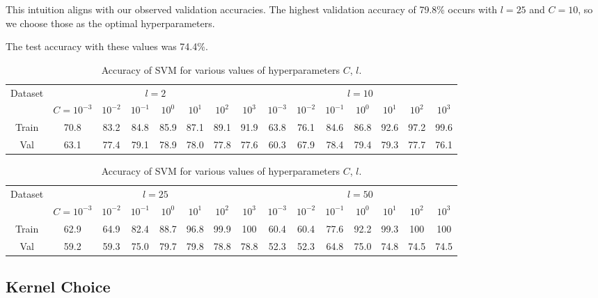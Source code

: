 This intuition aligns with our observed validation accuracies.
The highest validation accuracy of 79.8\% occurs with $l=25$ and $C=10$, so we choose those as the optimal hyperparameters.

The test accuracy with these values was 74.4\%.



\begin{table}[ht!]
\centering
\begin{tabular}{||c| c c c c c c c| c c c c c c c||}  
 \hline
 \multirow{2}{*}{Dataset} &
       \multicolumn{7}{c|}{$l=2$} &
       \multicolumn{7}{c||}{$l=10$} \\
 & $C=10^{-3}$ & $10^{-2}$ & $10^{-1}$ & $10^{0}$ & $10^{1}$ & $10^{2}$ & $10^{3}$ & $10^{-3}$ & $10^{-2}$ & $10^{-1}$ & $10^{0}$ & $10^{1}$ & $10^{2}$ & $10^{3}$ \\ [0.5ex] 
 \hline\hline
 Train & 70.8 & 83.2 & 84.8 & 85.9 & 87.1 & 89.1 & 91.9 & 63.8 & 76.1 & 84.6 & 86.8 & 92.6 & 97.2 & 99.6  \\ \hline
 Val & 63.1 & 77.4 & 79.1 & 78.9 & 78.0 & 77.8 & 77.6 & 60.3 & 67.9 & 78.4 & 79.4 & 79.3 & 77.7 & 76.1  \\ \hline
\end{tabular}
\begin{tabular}{||c| c c c c c c c| c c c c c c c||}  
 \hline
 \multirow{2}{*}{Dataset} &
       \multicolumn{7}{c|}{$l=25$} &
       \multicolumn{7}{c||}{$l=50$} \\
 & $C=10^{-3}$ & $10^{-2}$ & $10^{-1}$ & $10^{0}$ & $10^{1}$ & $10^{2}$ & $10^{3}$ & $10^{-3}$ & $10^{-2}$ & $10^{-1}$ & $10^{0}$ & $10^{1}$ & $10^{2}$ & $10^{3}$ \\ [0.5ex] 
 \hline\hline
 Train & 62.9 & 64.9 & 82.4 & 88.7 & 96.8 & 99.9 & 100 & 60.4 & 60.4 & 77.6 & 92.2 & 99.3 & 100 & 100  \\ \hline
 Val & 59.2 & 59.3 & 75.0 & 79.7 & 79.8 & 78.8 & 78.8 & 52.3 & 52.3 & 64.8 & 75.0 & 74.8 & 74.5 & 74.5  \\ \hline
\end{tabular}
\caption{Accuracy of SVM for various values of hyperparameters $C$, $l$.}
\label{table_svm}
\end{table}

\subsection{Kernel Choice}


